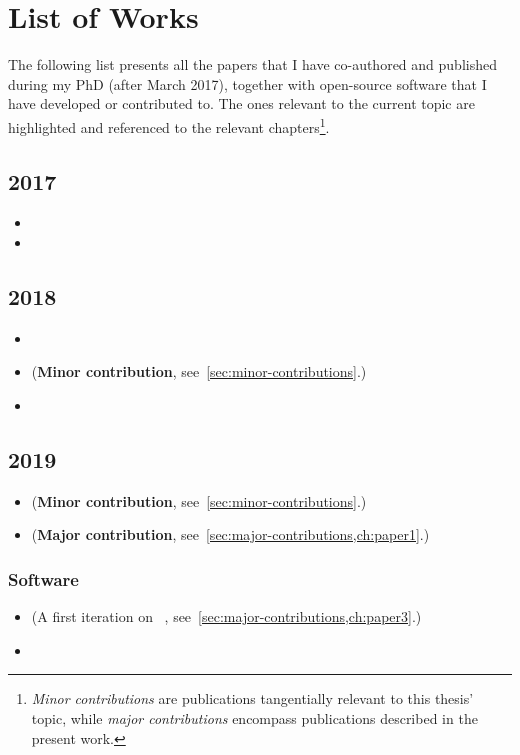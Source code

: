 \chapter{List of Works}%
\label{ch:all-works}

The following list presents all the papers that I have co-authored and published
during my PhD (after March 2017),
together with open-source software that I have developed or contributed to.
The ones relevant to the current topic are highlighted and referenced to
the relevant chapters\footnote{\emph{Minor contributions} are publications
	tangentially relevant to this thesis' topic, while \emph{major contributions}
	encompass publications described in the present work.}.

\section*{2017}
\begin{itemize}
	\item {}
	\item {}
\end{itemize}

\section*{2018}
\begin{itemize}
	\item {}
	\item {} (\textbf{Minor contribution}, see~\cref{sec:minor-contributions}.)
	\item {}
\end{itemize}

\section*{2019}
\begin{itemize}
	\item {} (\textbf{Minor contribution}, see~\cref{sec:minor-contributions}.)
	\item {} (\textbf{Major contribution}, see~\cref{sec:major-contributions,ch:paper1}.)
\end{itemize}

\subsection*{Software}
\begin{itemize}
	\item {} (A first iteration on
	      \overreact~\cite{Schneider2022,overreact2021zenodo}, see~\cref{sec:major-contributions,ch:paper3}.)
	\item {}
\end{itemize}

